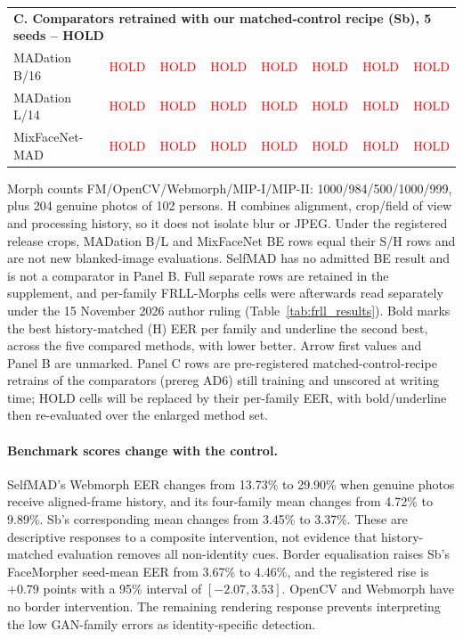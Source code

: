 \begin{table}[t]
\begin{tabular}{lrrrrrrr}
    \midrule
    \multicolumn{8}{l}{\textbf{C. Comparators retrained with our matched-control recipe (Sb), 5 seeds -- HOLD}} \\
    MADation B/16 & \textcolor{red}{HOLD} & \textcolor{red}{HOLD} & \textcolor{red}{HOLD} & \textcolor{red}{HOLD} & \textcolor{red}{HOLD} & \textcolor{red}{HOLD} & \textcolor{red}{HOLD} \\
    MADation L/14 & \textcolor{red}{HOLD} & \textcolor{red}{HOLD} & \textcolor{red}{HOLD} & \textcolor{red}{HOLD} & \textcolor{red}{HOLD} & \textcolor{red}{HOLD} & \textcolor{red}{HOLD} \\
    MixFaceNet-MAD & \textcolor{red}{HOLD} & \textcolor{red}{HOLD} & \textcolor{red}{HOLD} & \textcolor{red}{HOLD} & \textcolor{red}{HOLD} & \textcolor{red}{HOLD} & \textcolor{red}{HOLD} \\
    \bottomrule
    \end{tabular}
    \par\smallskip\raggedright
    Morph counts FM/OpenCV/Webmorph/MIP-I/MIP-II: 1000/984/500/1000/999, plus 204 genuine photos of 102 persons. H combines alignment, crop/field of view and processing history, so it does not isolate blur or JPEG. Under the registered release crops, MADation B/L and MixFaceNet BE rows equal their S/H rows and are not new blanked-image evaluations. SelfMAD has no admitted BE result and is not a comparator in Panel B. Full separate rows are retained in the supplement, and per-family FRLL-Morphs cells were afterwards read separately under the 15 November 2026 author ruling (Table~\ref{tab:frll_results}). Bold marks the best history-matched (H) EER per family and underline the second best, across the five compared methods, with lower better. Arrow first values and Panel B are unmarked. Panel C rows are pre-registered matched-control-recipe retrains of the comparators (prereg AD6) still training and unscored at writing time; HOLD cells will be replaced by their per-family EER, with bold/underline then re-evaluated over the enlarged method set.
    \end{table}
    
    
    \paragraph{Benchmark scores change with the control.}
    SelfMAD's Webmorph EER changes from 13.73\% to 29.90\% when genuine photos receive aligned-frame history, and its four-family mean changes from 4.72\% to 9.89\%. Sb's corresponding mean changes from 3.45\% to 3.37\%. These are descriptive responses to a composite intervention, not evidence that history-matched evaluation removes all non-identity cues. Border equalisation raises Sb's FaceMorpher seed-mean EER from 3.67\% to 4.46\%, and the registered rise is $+0.79$ points with a 95\% interval of $[-2.07,3.53]$. OpenCV and Webmorph have no border intervention. The remaining rendering response prevents interpreting the low GAN-family errors as identity-specific detection.
    
